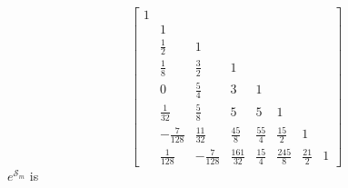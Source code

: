 \begin{displaymath}
\left[\begin{matrix}1 &   &   &   &   &   &   &  \\  & 1 &   &   &   &   &   &  \\  & \frac{1}{2} & 1 &   &   &   &   &  \\  & \frac{1}{8} & \frac{3}{2} & 1 &   &   &   &  \\  & 0   & \frac{5}{4} & 3 & 1 &   &   &  \\  & \frac{1}{32} & \frac{5}{8} & 5 & 5 & 1 &   &  \\  & - \frac{7}{128} & \frac{11}{32} & \frac{45}{8} & \frac{55}{4} & \frac{15}{2} & 1 &  \\  & \frac{1}{128} & - \frac{7}{128} & \frac{161}{32} & \frac{1 5}{4} & \frac{245}{8} & \frac{21}{2} & 1\end{matrix}\right]
\end{displaymath}
$e^{\mathcal{S}_{m}}$ is
